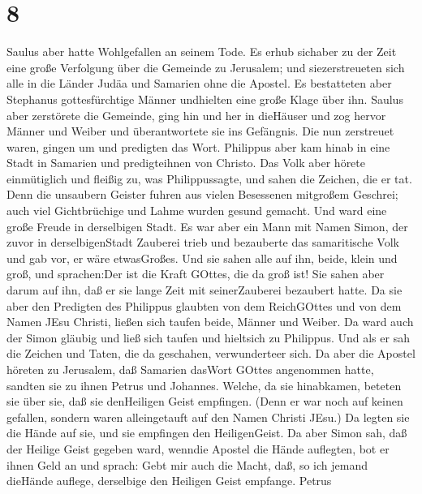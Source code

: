 \hypertarget{section-7}{%
\section{8}\label{section-7}}

 Saulus aber hatte Wohlgefallen an seinem Tode. Es erhub
sichaber zu der Zeit eine große Verfolgung über die Gemeinde zu
Jerusalem; und siezerstreueten sich alle in die Länder Judäa und
Samarien ohne die Apostel.  Es bestatteten aber Stephanus
gottesfürchtige Männer undhielten eine große Klage über ihn.
 Saulus aber zerstörete die Gemeinde, ging hin und her in
dieHäuser und zog hervor Männer und Weiber und überantwortete sie ins
Gefängnis.  Die nun zerstreuet waren, gingen um und
predigten das Wort.  Philippus aber kam hinab in eine Stadt
in Samarien und predigteihnen von Christo.  Das Volk aber
hörete einmütiglich und fleißig zu, was Philippussagte, und sahen die
Zeichen, die er tat.  Denn die unsaubern Geister fuhren aus
vielen Besessenen mitgroßem Geschrei; auch viel Gichtbrüchige und Lahme
wurden gesund gemacht.  Und ward eine große Freude in
derselbigen Stadt.  Es war aber ein Mann mit Namen Simon,
der zuvor in derselbigenStadt Zauberei trieb und bezauberte das
samaritische Volk und gab vor, er wäre etwasGroßes.  Und
sie sahen alle auf ihn, beide, klein und groß, und sprachen:Der ist die
Kraft GOttes, die da groß ist!  Sie sahen aber darum auf
ihn, daß er sie lange Zeit mit seinerZauberei bezaubert hatte.
 Da sie aber den Predigten des Philippus glaubten von dem
ReichGOttes und von dem Namen JEsu Christi, ließen sich taufen beide,
Männer und Weiber.  Da ward auch der Simon gläubig und ließ
sich taufen und hieltsich zu Philippus. Und als er sah die Zeichen und
Taten, die da geschahen, verwunderteer sich.  Da aber die
Apostel höreten zu Jerusalem, daß Samarien dasWort GOttes angenommen
hatte, sandten sie zu ihnen Petrus und Johannes.  Welche,
da sie hinabkamen, beteten sie über sie, daß sie denHeiligen Geist
empfingen.  (Denn er war noch auf keinen gefallen, sondern
waren alleingetauft auf den Namen Christi JEsu.)  Da legten
sie die Hände auf sie, und sie empfingen den HeiligenGeist.
 Da aber Simon sah, daß der Heilige Geist gegeben ward,
wenndie Apostel die Hände auflegten, bot er ihnen Geld an 
und sprach: Gebt mir auch die Macht, daß, so ich jemand dieHände
auflege, derselbige den Heiligen Geist empfange.  Petrus
